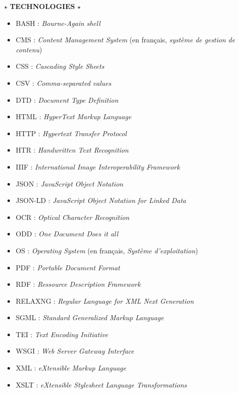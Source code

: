 \begin{center}
$\star$ \textbf{\textsc{TECHNOLOGIES}} $\star$
\end{center} 
\begin{itemize}
    \item BASH : \emph{Bourne-Again shell}
    \item CMS : \emph{Content Management System} (en français, \emph{système de gestion de contenu})
    \item CSS : \emph{Cascading Style Sheets}
    \item CSV : \emph{Comma-separated values}
    \item DTD : \emph{Document Type Definition}
    \item HTML : \emph{HyperText Markup Language}
    \item HTTP : \emph{Hypertext Transfer Protocol}
    \item HTR : \emph{Handwritten Text Recognition}
    \item IIIF : \emph{International Image Interoperability Framework}
    \item JSON : \emph{JavaScript Object Notation}
    \item JSON-LD : \emph{JavaScript Object Notation for Linked Data}
    \item OCR : \emph{Optical Character Recognition}
    \item ODD : \emph{One Document Does it all}
    \item OS : \emph{Operating System} (en français, \emph{Système d'exploitation})
    \item PDF : \emph{Portable Document Format}
    \item RDF : \emph{\textit{Ressource Description Framework}}
    \item RELAXNG : \emph{Regular Language for XML Next Generation}
    \item SGML : \emph{Standard Generalized Markup Language}
    \item TEI : \emph{Text Encoding Initiative}
    \item WSGI : \emph{Web Server Gateway Interface}
    \item XML : \emph{eXtensible Markup Language}
    \item XSLT : \emph{eXtensible Stylesheet Language Transformations}
\end{itemize}

